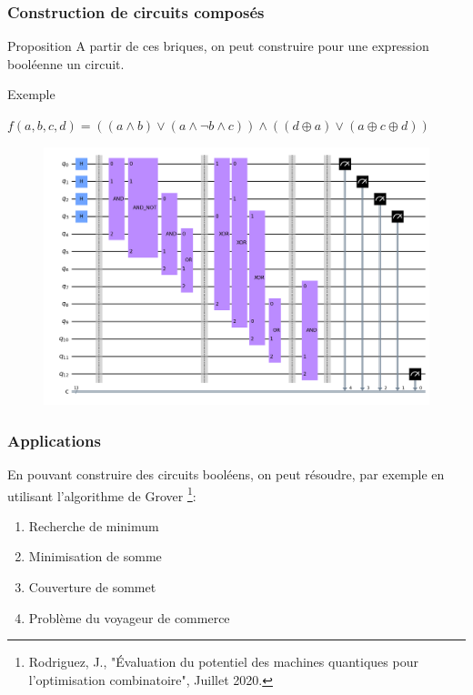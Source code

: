 \documentclass{beamer}
\begin{document}
\begin{frame}
    \frametitle{Construction de circuits composés}

    \begin{block}{Proposition}
        \tiny
        A partir de ces briques, on peut construire pour une expression booléenne un circuit.
    \end{block}

    \medbreak

    \begin{block}{Exemple}

        \tiny $f(a, b, c, d) = ((a \land b) \lor (a \land \neg b \land c)) \land ((d \oplus a) \lor (a \oplus c \oplus d))$

        \begin{figure}[H]
            \centering
            \centerline{
                \includegraphics[scale=0.20]{circuit.png}
            }
            \label{fig:circ_ex_1_1_1}
        \end{figure}
    \end{block}
\end{frame}

\begin{frame}
    \frametitle{Applications}

    En pouvant construire des circuits booléens, on peut résoudre, par exemple en utilisant l'algorithme de Grover \footnote{Rodriguez, J., "\'Evaluation du potentiel des machines quantiques pour l'optimisation combinatoire", Juillet 2020. }:

    \begin{enumerate}
        \item Recherche de minimum
        \item Minimisation de somme
        \item Couverture de sommet
        \item Problème du voyageur de commerce
    \end{enumerate}
\end{frame}
\end{document}
